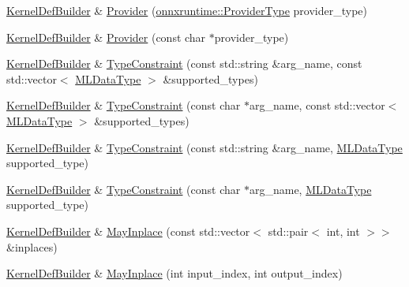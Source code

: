 \begin{DoxyCompactItemize}
\item 
\mbox{\hyperlink{classonnxruntime_1_1KernelDefBuilder}{Kernel\+Def\+Builder}} \& \mbox{\hyperlink{classonnxruntime_1_1KernelDefBuilder_a4c611ef799829acfb5840ba54b674bbc}{Provider}} (\mbox{\hyperlink{namespaceonnxruntime_a863e2227cbf32aab76aad35fdadff4bb}{onnxruntime\+::\+Provider\+Type}} provider\+\_\+type)
\item 
\mbox{\hyperlink{classonnxruntime_1_1KernelDefBuilder}{Kernel\+Def\+Builder}} \& \mbox{\hyperlink{classonnxruntime_1_1KernelDefBuilder_a8080207b519f893039fd23f8d0df2d44}{Provider}} (const char $\ast$provider\+\_\+type)
\item 
\mbox{\hyperlink{classonnxruntime_1_1KernelDefBuilder}{Kernel\+Def\+Builder}} \& \mbox{\hyperlink{classonnxruntime_1_1KernelDefBuilder_a254e5b098bd2f9fcac0b81c5b53db954}{Type\+Constraint}} (const std\+::string \&arg\+\_\+name, const std\+::vector$<$ \mbox{\hyperlink{namespaceonnxruntime_ad77d0a6e838ec7da5dc35fed5ee66b49}{M\+L\+Data\+Type}} $>$ \&supported\+\_\+types)
\item 
\mbox{\hyperlink{classonnxruntime_1_1KernelDefBuilder}{Kernel\+Def\+Builder}} \& \mbox{\hyperlink{classonnxruntime_1_1KernelDefBuilder_af026d3a65a6dcd22355f7b8a37c927ae}{Type\+Constraint}} (const char $\ast$arg\+\_\+name, const std\+::vector$<$ \mbox{\hyperlink{namespaceonnxruntime_ad77d0a6e838ec7da5dc35fed5ee66b49}{M\+L\+Data\+Type}} $>$ \&supported\+\_\+types)
\item 
\mbox{\hyperlink{classonnxruntime_1_1KernelDefBuilder}{Kernel\+Def\+Builder}} \& \mbox{\hyperlink{classonnxruntime_1_1KernelDefBuilder_ae4eddf54996695a1c7434e811e42cde2}{Type\+Constraint}} (const std\+::string \&arg\+\_\+name, \mbox{\hyperlink{namespaceonnxruntime_ad77d0a6e838ec7da5dc35fed5ee66b49}{M\+L\+Data\+Type}} supported\+\_\+type)
\item 
\mbox{\hyperlink{classonnxruntime_1_1KernelDefBuilder}{Kernel\+Def\+Builder}} \& \mbox{\hyperlink{classonnxruntime_1_1KernelDefBuilder_a8744059bf033d05df187864acec7d75a}{Type\+Constraint}} (const char $\ast$arg\+\_\+name, \mbox{\hyperlink{namespaceonnxruntime_ad77d0a6e838ec7da5dc35fed5ee66b49}{M\+L\+Data\+Type}} supported\+\_\+type)
\item 
\mbox{\hyperlink{classonnxruntime_1_1KernelDefBuilder}{Kernel\+Def\+Builder}} \& \mbox{\hyperlink{classonnxruntime_1_1KernelDefBuilder_a9748acafc76a7cba8a687609076b36b0}{May\+Inplace}} (const std\+::vector$<$ std\+::pair$<$ int, int $>$$>$ \&inplaces)
\item 
\mbox{\hyperlink{classonnxruntime_1_1KernelDefBuilder}{Kernel\+Def\+Builder}} \& \mbox{\hyperlink{classonnxruntime_1_1KernelDefBuilder_a600587148ba45e668cbe5fca9324133f}{May\+Inplace}} (int input\+\_\+index, int output\+\_\+index)
$$
\end{DoxyCompactItemize}
